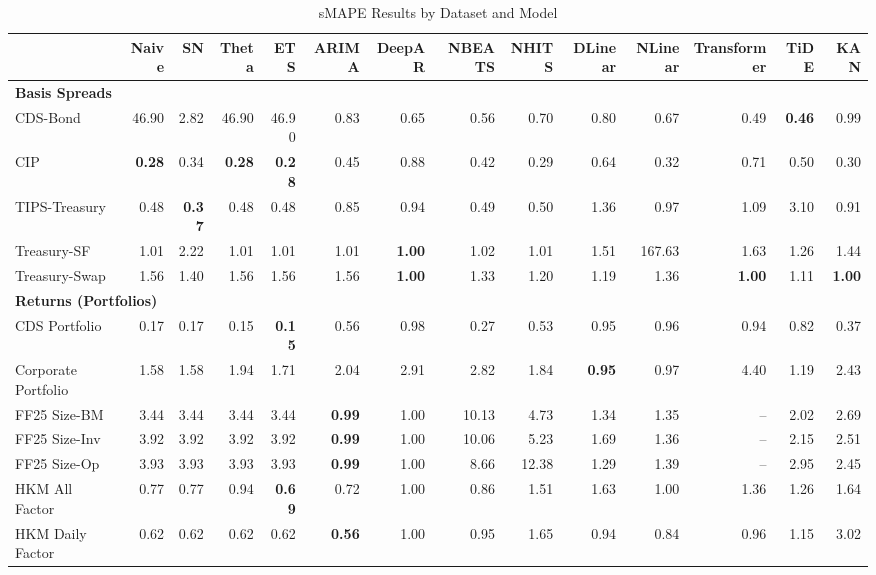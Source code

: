 
\begin{table}[htbp]
\centering
\caption{sMAPE Results by Dataset and Model}
\label{tab:smape_results}
\scriptsize
\setlength{\tabcolsep}{1.5pt}
\renewcommand{\arraystretch}{0.9}
\begin{tabular}{@{}lrrrrrrrrrrrrr@{}}
\toprule
 & Naive & SN & Theta & ETS & ARIMA & DeepAR & NBEATS & NHITS & DLinear & NLinear & Transformer & TiDE & KAN \\
\midrule
\multicolumn{14}{l}{\textbf{Basis Spreads}} \\
CDS-Bond & 46.90 & 2.82 & 46.90 & 46.90 & 0.83 & 0.65 & 0.56 & 0.70 & 0.80 & 0.67 & 0.49 & \textbf{0.46} & 0.99 \\
CIP & \textbf{0.28} & 0.34 & \textbf{0.28} & \textbf{0.28} & 0.45 & 0.88 & 0.42 & 0.29 & 0.64 & 0.32 & 0.71 & 0.50 & 0.30 \\
TIPS-Treasury & 0.48 & \textbf{0.37} & 0.48 & 0.48 & 0.85 & 0.94 & 0.49 & 0.50 & 1.36 & 0.97 & 1.09 & 3.10 & 0.91 \\
Treasury-SF & 1.01 & 2.22 & 1.01 & 1.01 & 1.01 & \textbf{1.00} & 1.02 & 1.01 & 1.51 & 167.63 & 1.63 & 1.26 & 1.44 \\
Treasury-Swap & 1.56 & 1.40 & 1.56 & 1.56 & 1.56 & \textbf{1.00} & 1.33 & 1.20 & 1.19 & 1.36 & \textbf{1.00} & 1.11 & \textbf{1.00} \\
\midrule
\multicolumn{14}{l}{\textbf{Returns (Portfolios)}} \\
CDS Portfolio & 0.17 & 0.17 & 0.15 & \textbf{0.15} & 0.56 & 0.98 & 0.27 & 0.53 & 0.95 & 0.96 & 0.94 & 0.82 & 0.37 \\
Corporate Portfolio & 1.58 & 1.58 & 1.94 & 1.71 & 2.04 & 2.91 & 2.82 & 1.84 & \textbf{0.95} & 0.97 & 4.40 & 1.19 & 2.43 \\
FF25 Size-BM & 3.44 & 3.44 & 3.44 & 3.44 & \textbf{0.99} & 1.00 & 10.13 & 4.73 & 1.34 & 1.35 & -- & 2.02 & 2.69 \\
FF25 Size-Inv & 3.92 & 3.92 & 3.92 & 3.92 & \textbf{0.99} & 1.00 & 10.06 & 5.23 & 1.69 & 1.36 & -- & 2.15 & 2.51 \\
FF25 Size-Op & 3.93 & 3.93 & 3.93 & 3.93 & \textbf{0.99} & 1.00 & 8.66 & 12.38 & 1.29 & 1.39 & -- & 2.95 & 2.45 \\
HKM All Factor & 0.77 & 0.77 & 0.94 & \textbf{0.69} & 0.72 & 1.00 & 0.86 & 1.51 & 1.63 & 1.00 & 1.36 & 1.26 & 1.64 \\
HKM Daily Factor & 0.62 & 0.62 & 0.62 & 0.62 & \textbf{0.56} & 1.00 & 0.95 & 1.65 & 0.94 & 0.84 & 0.96 & 1.15 & 3.02 \\

\end{tabular}
\end{table}
